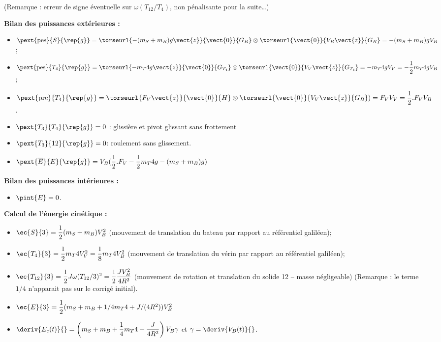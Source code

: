 \begin{multicols}{2}
\begin{corrige}
(Remarque : erreur de signe éventuelle sur $\omega\left({T_{12}}/{T_{4}}\right)$, non pénalisante pour la suite…)


\textbf{Bilan des puissances extérieures :}
\begin{itemize}
\item $\pext{\text{pes}}{S}{\rep{g}}=\torseurl{-(m_S+m_B )g\vect{z}}{\vect{0}}{G_B} \otimes \torseurl{\vect{0}}{V_B \vect{z}}{G_B} = -(m_S+m_B )gV_B$;
\item $\pext{\text{pes}}{T_4}{\rep{g}}=\torseurl{-m_T4 g\vect{z}}{\vect{0}}{G_{T_4}} \otimes \torseurl{\vect{0}}{V_V \vect{z}}{G_{T_4}}=-m_T4 gV_V=-\dfrac{1}{2} m_T4 gV_B$;
\item $\pext{\text{pre}}{T_4}{\rep{g}}=\torseurl{F_V \vect{z}}{\vect{0}}{H} \otimes \torseurl{\vect{0}}{V_V \vect{z}}{G_B})=F_V V_V=\dfrac{1}{2}.F_V V_B$.
\item $\pext{T_3}{T_4}{\rep{g}}=0$ : glissière et pivot glissant sans frottement
\item $\pext{T_3}{12}{\rep{g}}=0 $: roulement sans glissement.
\item $\pext{\overline{E}}{E}{\rep{g}}=V_B (\dfrac{1}{2}.F_V-\dfrac{1}{2} m_T4 g-(m_S+m_B )g)$
\end{itemize}

\textbf{Bilan des puissances intérieures :}
\begin{itemize}
\item $\pint{E}=0$.
\end{itemize}

\textbf{Calcul de l’énergie cinétique :}
\begin{itemize}
\item $\ec{S}{3}=\dfrac{1}{2} (m_S+m_B ) V_B^2$ (mouvement de translation du bateau par rapport au référentiel galiléen);
\item $\ec{T_4}{3}=\dfrac{1}{2} m_T4 V_V^2=\dfrac{1}{8} m_T4 V_B^2$ (mouvement de translation du vérin par rapport au référentiel galiléen);
\item $\ec{T_{12}}{3}=\dfrac{1}{2} J\omega(T_{12}/3)^2=\dfrac{1}{2}  \dfrac{JV_B^2}{4R^2}$ (mouvement de rotation et translation du solide 12 -- masse négligeable) (Remarque : le terme $1/4$ n’apparait pas sur le corrigé initial).
\item $\ec{E}{3}=\dfrac{1}{2} (m_S+m_B+1/4 m_T4+J/(4R^2 )) V_B^2$
\item $\deriv{E_c(t)}{}=\left(m_S+m_B+\dfrac{1}{4}m_T4+\dfrac{J}{4R^2 }\right) V_B \gamma$ et $\gamma=\deriv{V_B(t)}{}$.
\end{itemize}


\end{corrige}
\end{multicols}
